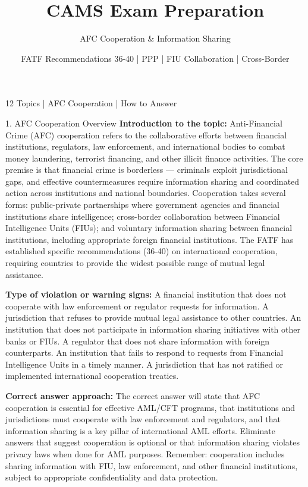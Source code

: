 \documentclass[11pt,a4paper]{beamer}
\title[CAMS Exam Preparation]{CAMS Exam Preparation}
\subtitle{AFC Cooperation \& Information Sharing}
\author{FATF Recommendations 36-40 | PPP | FIU Collaboration | Cross-Border}
\date{}
\begin{document}
\begin{frame}
\titlepage
\centering
\tiny 12 Topics | AFC Cooperation | How to Answer
\end{frame}

\begin{frame}{1. AFC Cooperation Overview}
\tiny
\noindent\textbf{Introduction to the topic:} Anti-Financial Crime (AFC) cooperation refers to the collaborative efforts between financial institutions, regulators, law enforcement, and international bodies to combat money laundering, terrorist financing, and other illicit finance activities. The core premise is that financial crime is borderless — criminals exploit jurisdictional gaps, and effective countermeasures require information sharing and coordinated action across institutions and national boundaries. Cooperation takes several forms: public-private partnerships where government agencies and financial institutions share intelligence; cross-border collaboration between Financial Intelligence Units (FIUs); and voluntary information sharing between financial institutions, including appropriate foreign financial institutions. The FATF has established specific recommendations (36-40) on international cooperation, requiring countries to provide the widest possible range of mutual legal assistance.

\vspace{0.1cm}
\noindent\textbf{Type of violation or warning signs:} A financial institution that does not cooperate with law enforcement or regulator requests for information. A jurisdiction that refuses to provide mutual legal assistance to other countries. An institution that does not participate in information sharing initiatives with other banks or FIUs. A regulator that does not share information with foreign counterparts. An institution that fails to respond to requests from Financial Intelligence Units in a timely manner. A jurisdiction that has not ratified or implemented international cooperation treaties.

\vspace{0.1cm}
\noindent\textbf{Correct answer approach:} The correct answer will state that AFC cooperation is essential for effective AML/CFT programs, that institutions and jurisdictions must cooperate with law enforcement and regulators, and that information sharing is a key pillar of international AML efforts. Eliminate answers that suggest cooperation is optional or that information sharing violates privacy laws when done for AML purposes. Remember: cooperation includes sharing information with FIU, law enforcement, and other financial institutions, subject to appropriate confidentiality and data protection.
\end{frame}
\end{document}

